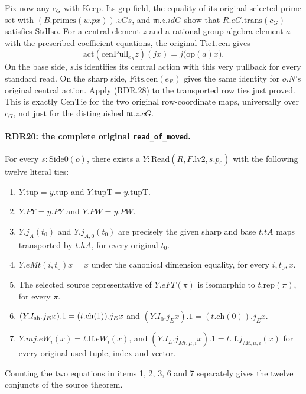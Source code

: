 Fix now any \(c_G\) with \(\mathrm{Keep}\).  Its
\(\mathrm{grp}\) field, the equality of its original
selected-prime set with \((B.\mathrm{primes}(w.px)).vGs\),
and \(\mathfrak m.z.idG\) show that
\(R.eG.\mathrm{trans}(c_G)\) satisfies \(\mathrm{StdIso}\).
For a central element \(z\) and a rational group-algebra
element \(a\) with the prescribed coefficient equations,
the original \(\mathrm{Tie1.cen}\) gives
\[
 \mathrm{act}(\mathrm{cenPull}_{e_R}z)(jx)
                           =j\bigl(\mathrm{op}(a)x\bigr).  \tag{RDR.28}
\]
On the base side, \(s.\mathrm{is}\) identifies its central
action with this very pullback for every standard read.
On the sharp side, \(\mathrm{Fits.cen}(e_R)\) gives the
same identity for \(o.N\)'s original central action.
Apply (RDR.28) to the transported row ties just proved.
This is exactly \(\mathrm{CenTie}\) for the two original
row-coordinate maps, universally over \(c_G\), not just
for the distinguished \(\mathfrak m.z.cG\).

\paragraph{RDR20: the complete original \texttt{read\_of\_moved}.}
\label{claim:RDR20}
For every \(s:\mathrm{Side0}(o)\), there exists a
\(Y:\mathrm{Read}(R,F.\mathrm{lv2},s.p_0)\) with the
following twelve literal ties:
\begin{enumerate}
\item \(Y.\mathrm{tup}=y.\mathrm{tup}\) and
      \(Y.\mathrm{tupT}=y.\mathrm{tupT}\).
\item \(Y.PY=y.PY\) and \(Y.PW=y.PW\).
\item \(Y.j_A(t_0)\) and \(Y.j_{A,0}(t_0)\) are precisely
      the given sharp and base \(t.tA\) maps transported by
      \(t.hA\), for every original \(t_0\).
\item \(Y.eMt(i,t_0)x=x\) under the canonical dimension
      equality, for every \(i,t_0,x\).
\item The selected source representative of \(Y.eFT(\pi)\)
      is isomorphic to \(t.\mathrm{rep}(\pi)\), for every \(\pi\).
\item \((Y.I_{\rm sh}.j_E x).1=(t.\mathrm{ch}(1)).j_E x\)
      and \((Y.I_0.j_E x).1=(t.\mathrm{ch}(0)).j_E x\).
\item \(Y.mj.eW_i(x)=t.\mathrm{lf}.eW_i(x)\), and
      \((Y.I_L.j_{Mt,\mu,i}x).1=t.\mathrm{lf}.j_{Mt,\mu,i}(x)\)
      for every original used tuple, index and vector.
\end{enumerate}
Counting the two equations in items 1, 2, 3, 6 and 7 separately
gives the twelve conjuncts of the source theorem.


